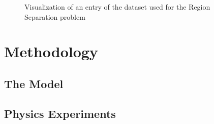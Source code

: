 \begin{figure}[!htb]
    \centering
    
    
    \caption{Visualization of an entry of the dataset used for the Region Separation problem}
    
    \label{fig:regions_separation_dataset_visualization}
\end{figure}




\section{Methodology}


\subsection{The Model}


\subsection{Physics Experiments}


